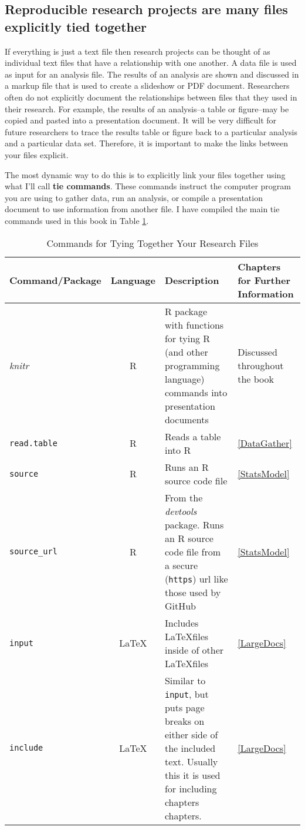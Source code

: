 \documentclass[ChapterTOCs,krantz1]{krantz}\usepackage{graphicx, color}
\begin{document}
\subsection{Reproducible research projects are many files explicitly tied together}

If everything is just a text file then research projects can be thought of as individual text files that have a relationship with one another. A data file is used as input for an analysis file. The results of an analysis are shown and discussed in a markup file that is used to create a slideshow or PDF document. Researchers often do not explicitly document the relationships between files that they used in their research. For example, the results of an analysis--a table or figure--may be copied and pasted into a presentation document. It will be very difficult for future researchers to trace the results table or figure back to a particular analysis and a particular data set. Therefore, it is important to make the links between your files explicit. 

The most dynamic way to do this is to explicitly link your files together using what I'll call {\bf{tie commands}}.  These commands instruct the computer program you are using to gather data, run an analysis, or compile a presentation document to use information from another file. I have compiled the main tie commands used in this book in Table \ref{TableTieCommands}.

\begin{landscape}
\begin{table}
    \caption{Commands for Tying Together Your Research Files}
    \label{TableTieCommands}
    \vspace{0.3cm}
    \begin{tabular}{l c  p{6.5cm}  m{4cm}}
        \hline
        Command/Package & Language & Description & Chapters for Further Information \\  
        \hline \hline
        {\emph{knitr}} & R & R package with functions for tying R (and other programming language) commands into presentation documents & Discussed throughout the book \\
        {\tt{read.table}} & R & Reads a table into R & \ref{DataGather} \\
        {\tt{source}} & R & Runs an R source code file & \ref{StatsModel} \\
        {\tt{source\_url}} & R & From the {\emph{devtools}} package. Runs an R source code file from a secure ({\tt{https}}) url like those used by GitHub & \ref{StatsModel} \\
        {\tt{input}} & \LaTeX & Includes \LaTeX files inside of other \LaTeX files & \ref{LargeDocs} \\
        {\tt{include}} & \LaTeX & Similar to {\tt{input}}, but puts page breaks on either side of the included text. Usually this it is used for including chapters chapters. & \ref{LargeDocs} \\
        
        \hline 
        
    \end{tabular}
\end{table}
\end{landscape}
\end{document}
